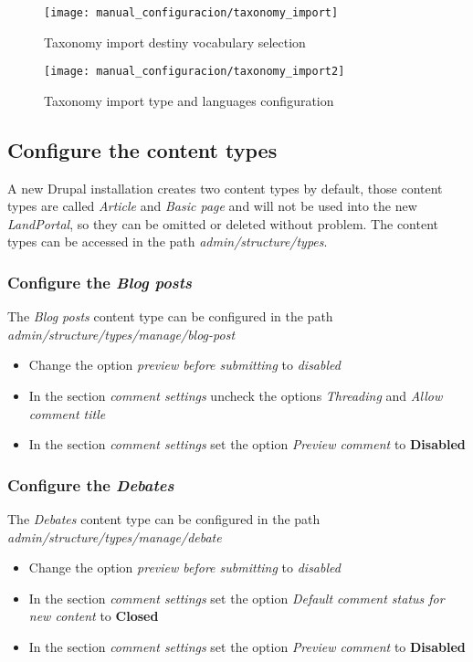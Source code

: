 \begin{figure}[h]
	\centering
	\texttt{[image: manual\_configuracion/taxonomy\_import]}
	\caption{Taxonomy import destiny vocabulary selection}
	\label{fig:manual_configuracion_taxonomyimport}
\end{figure}
\begin{figure}[h]
	\centering
	\texttt{[image: manual\_configuracion/taxonomy\_import2]}
	\caption{Taxonomy import type and languages configuration}
	\label{fig:manual_configuracion_taxonomyimport2}
\end{figure}



\subsection{Configure the content types}
A new Drupal installation creates two content types by default, those content types are called \textit{Article} and \textit{Basic page} and will not be used into the new \textit{LandPortal}, so they can be omitted or deleted without problem.  The content types can be accessed in the path \textit{admin/structure/types}.

\subsubsection{Configure the \textit{Blog posts}}
The \textit{Blog posts} content type can be configured in the path \textit{admin/structure/types/manage/blog-post}
\begin{itemize}
	\item Change the option \textit{preview before submitting} to \textit{disabled}
	\item In the section \textit{comment settings} uncheck the options \textit{Threading} and \textit{Allow comment title}
	\item In the section \textit{comment settings} set the option \textit{Preview comment} to \textbf{Disabled}
\end{itemize}

\subsubsection{Configure the \textit{Debates}}
The \textit{Debates} content type can be configured in the path \textit{admin/structure/types/manage/debate}
\begin{itemize}
	\item Change the option \textit{preview before submitting} to \textit{disabled}
	\item In the section \textit{comment settings} set the option \textit{Default comment status for new content} to \textbf{Closed}
	\item In the section \textit{comment settings} set the option \textit{Preview comment} to \textbf{Disabled}
\end{itemize}

